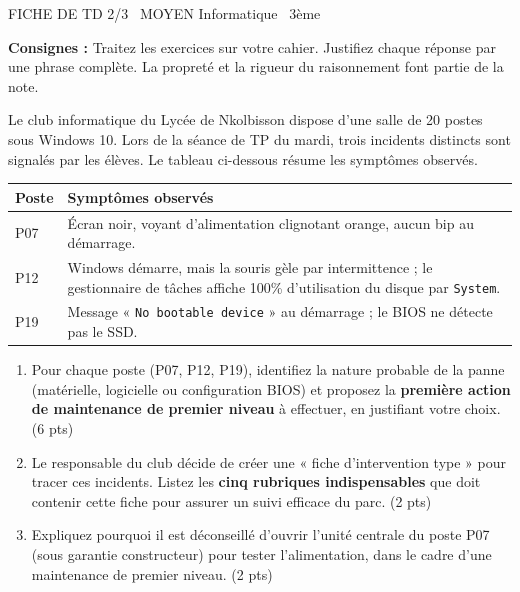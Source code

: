 \documentclass[11pt]{article}
\begin{document}
\begin{tcolorbox}[enhanced,colback=popink,colframe=popink,arc=10pt,boxrule=0pt,left=12pt,right=12pt,top=9pt,bottom=9pt]
{\color{white}\popxbold\small FICHE DE TD 2/3 \textbullet\ MOYEN \hfill Informatique \textbullet\ 3ème\par}
\end{tcolorbox}
\vspace{4pt}
\noindent \textbf{Consignes :} Traitez les exercices sur votre cahier. Justifiez chaque réponse par une phrase complète. La propreté et la rigueur du raisonnement font partie de la note.

\begin{exercice}
Le club informatique du Lycée de Nkolbisson dispose d'une salle de 20 postes sous Windows 10. Lors de la séance de TP du mardi, trois incidents distincts sont signalés par les élèves. Le tableau ci-dessous résume les symptômes observés.

\begin{tabularx}{\linewidth}{@{}lX@{}}
\toprule
\textbf{Poste} & \textbf{Symptômes observés} \\
\midrule
P07 & Écran noir, voyant d'alimentation clignotant orange, aucun bip au démarrage. \\
P12 & Windows démarre, mais la souris gèle par intermittence ; le gestionnaire de tâches affiche 100\% d'utilisation du disque par \texttt{System}. \\
P19 & Message « \texttt{No bootable device} » au démarrage ; le BIOS ne détecte pas le SSD. \\
\bottomrule
\end{tabularx}

\begin{enumerate}
    \item Pour chaque poste (P07, P12, P19), identifiez la nature probable de la panne (matérielle, logicielle ou configuration BIOS) et proposez la \textbf{première action de maintenance de premier niveau} à effectuer, en justifiant votre choix. (6 pts)
    \item Le responsable du club décide de créer une « fiche d'intervention type » pour tracer ces incidents. Listez les \textbf{cinq rubriques indispensables} que doit contenir cette fiche pour assurer un suivi efficace du parc. (2 pts)
    \item Expliquez pourquoi il est déconseillé d'ouvrir l'unité centrale du poste P07 (sous garantie constructeur) pour tester l'alimentation, dans le cadre d'une maintenance de premier niveau. (2 pts)
\end{enumerate}
\end{exercice}
\end{document}
